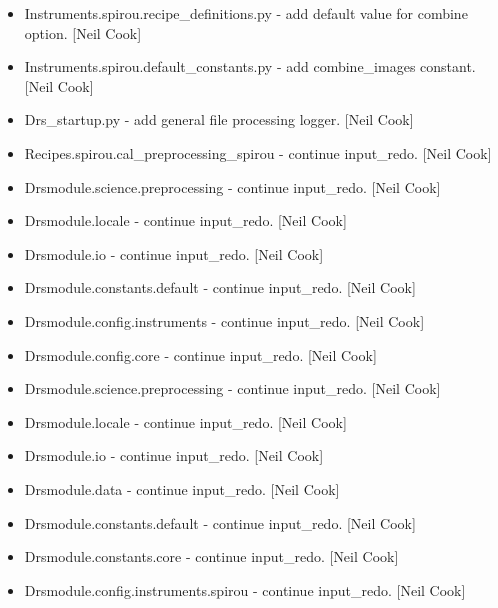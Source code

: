 \documentclass[a4paper,10pt,english]{report}
\begin{document}
\begin{itemize}
\item {} 
Instruments.spirou.recipe\_definitions.py - add default value for
combine option. {[}Neil Cook{]}

\item {} 
Instruments.spirou.default\_constants.py - add combine\_images constant.
{[}Neil Cook{]}

\item {} 
Drs\_startup.py - add general file processing logger. {[}Neil Cook{]}

\item {} 
Recipes.spirou.cal\_preprocessing\_spirou - continue input\_redo. {[}Neil
Cook{]}

\item {} 
Drsmodule.science.preprocessing - continue input\_redo. {[}Neil Cook{]}

\item {} 
Drsmodule.locale - continue input\_redo. {[}Neil Cook{]}

\item {} 
Drsmodule.io - continue input\_redo. {[}Neil Cook{]}

\item {} 
Drsmodule.constants.default - continue input\_redo. {[}Neil Cook{]}

\item {} 
Drsmodule.config.instruments - continue input\_redo. {[}Neil Cook{]}

\item {} 
Drsmodule.config.core - continue input\_redo. {[}Neil Cook{]}

\item {} 
Drsmodule.science.preprocessing - continue input\_redo. {[}Neil Cook{]}

\item {} 
Drsmodule.locale - continue input\_redo. {[}Neil Cook{]}

\item {} 
Drsmodule.io - continue input\_redo. {[}Neil Cook{]}

\item {} 
Drsmodule.data - continue input\_redo. {[}Neil Cook{]}

\item {} 
Drsmodule.constants.default - continue input\_redo. {[}Neil Cook{]}

\item {} 
Drsmodule.constants.core - continue input\_redo. {[}Neil Cook{]}

\item {} 
Drsmodule.config.instruments.spirou - continue input\_redo. {[}Neil Cook{]}


\end{itemize}
\end{document}
